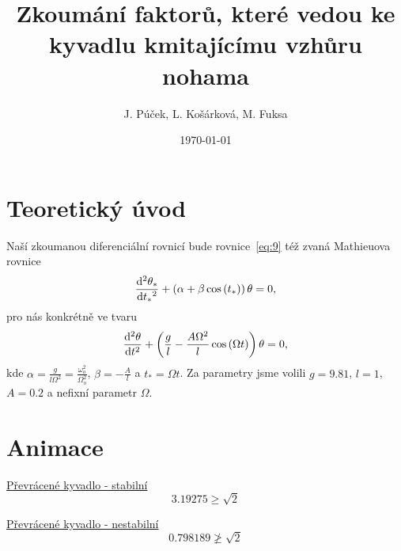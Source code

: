 \documentclass{beamer}
\title[Převrácené kyvadlo]{Zkoumání faktorů, které vedou ke kyvadlu kmitajícímu vzhůru nohama}
\author[J. P., L. K., M. F.]{J. Púček, L. Košárková, M. Fuksa}
\institute[Univerzita Karlova]{Univerzita Karlova, Česká republika}
\date{\today}
\begin{document}
\begin{frame}
\titlepage
\end{frame}

\section{Teoretický úvod}
\label{sec:uvod}

\begin{frame}
\begin{center}
			Naší zkoumanou diferenciální rovnicí bude rovnice~\eqref{eq:9} též zvaná Mathieuova rovnice
		\begin{equation}
			\label{eq:9}
			\frac{\mathrm{d}^2 {\theta_{*}}}{\mathrm{d} {t_{*}}^2}
			+
			\left(
			\alpha
			+
			\beta \cos \left( t_{*} \right)
			\right)
			\theta
			=
			0
			,
		\end{equation}
			pro nás konkrétně ve tvaru
		\begin{equation}
			\label{eq:10}
			\frac{\mathrm{d}^2 {\theta}}{\mathrm{d} {t}^2}
			+
			\left(
			\frac{g}{l}
			-
			\frac{A \Omega^2}{l} \cos \left( \Omega t \right)
			\right)
			\theta
			=
			0
			,
		\end{equation}
			kde $\alpha=\frac{g}{l\Omega^2}=\frac{\omega_{o}^2}{\Omega_{o}^2}$, $ \beta=-\frac{A}{l}$ a $t_{*}=\Omega t$. Za parametry jsme volili $g=9.81$, $l=1$,  $A=0.2$ a nefixní parametr $\Omega$.
		\end{center}
\end{frame}

\section{Animace}
\label{sec:animace}

\begin{frame}
\begin{center}
\href{run:./animace.mp4}{Převrácené kyvadlo - stabilní}
\begin{equation*}
3.19275 \geq \sqrt{2}
\end{equation*}
\end{center}
\end{frame}

\begin{frame}
\begin{center}
\href{run:./animace2.mp4}{Převrácené kyvadlo - nestabilní}
\begin{equation*}
0.798189 \ngeq \sqrt{2}
\end{equation*}
\end{center}
\end{frame}
\end{document}
